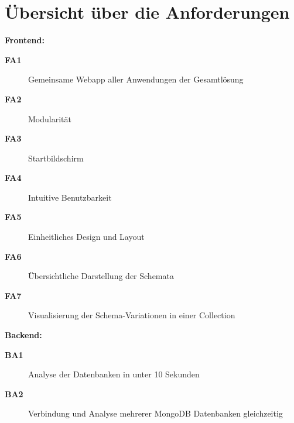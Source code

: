 \cleardoublepage

\section{Übersicht über die Anforderungen}
\label{sec:anf_uebersicht}

\textbf{Frontend:}

\begin{description}
    \item[\textbf{FA1}\label{itm:fa1}] Gemeinsame Webapp aller Anwendungen der Gesamtlösung
    \item[\textbf{FA2}\label{itm:fa2}] Modularität
    \item[\textbf{FA3}\label{itm:fa3}] Startbildschirm
    \item[\textbf{FA4}\label{itm:fa4}] Intuitive Benutzbarkeit
    \item[\textbf{FA5}\label{itm:fa5}] Einheitliches Design und Layout
    \item[\textbf{FA6}\label{itm:fa6}] Übersichtliche Darstellung der Schemata
    \item[\textbf{FA7}\label{itm:fa7}] Visualisierung der Schema-Variationen in einer Collection
\end{description}

\textbf{Backend:}

\begin{description}
    \item[\textbf{BA1}\label{itm:ba1}] Analyse der Datenbanken in unter 10 Sekunden
    \item[\textbf{BA2}\label{itm:ba2}] Verbindung und Analyse mehrerer MongoDB Datenbanken gleichzeitig
\end{description}

